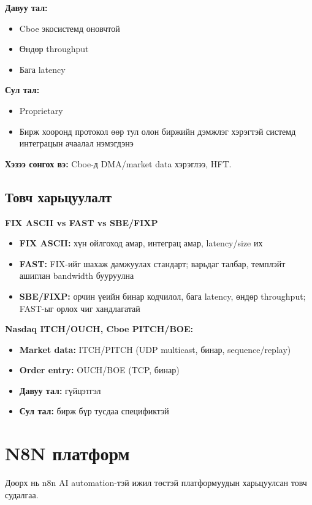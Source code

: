 {\textbf{Давуу тал:}}
\begin{itemize}
    \item Cboe экосистемд оновчтой
    \item Өндөр throughput
    \item Бага latency
\end{itemize}

{\textbf{Сул тал:}}
\begin{itemize}
    \item Proprietary
    \item Бирж хооронд протокол өөр тул олон биржийн дэмжлэг хэрэгтэй системд интеграцын ачаалал нэмэгдэнэ
\end{itemize}

\textbf{Хэзээ сонгох вэ:} Cboe-д DMA/market data хэрэглээ, HFT.

\subsection{Товч харьцуулалт}

\textbf{FIX ASCII vs FAST vs SBE/FIXP}
\begin{itemize}
    \item \textbf{FIX ASCII:} хүн ойлгоход амар, интеграц амар, latency/size их
    \item \textbf{FAST:} FIX-ийг шахаж дамжуулах стандарт; варьдаг талбар, темплэйт ашиглан bandwidth бууруулна
    \item \textbf{SBE/FIXP:} орчин үеийн бинар кодчилол, бага latency, өндөр throughput; FAST-ыг орлох чиг хандлагатай
\end{itemize}

\textbf{Nasdaq ITCH/OUCH, Cboe PITCH/BOE:}
\begin{itemize}
    \item \textbf{Market data:} ITCH/PITCH (UDP multicast, бинар, sequence/replay)
    \item \textbf{Order entry:} OUCH/BOE (TCP, бинар)
    \item \textbf{Давуу тал:} гүйцэтгэл
    \item \textbf{Сул тал:} бирж бүр тусдаа спецификтэй
\end{itemize}


\section{N8N платформ}

Доорх нь n8n AI automation-тэй ижил төстэй платформуудын харьцуулсан товч судалгаа.

